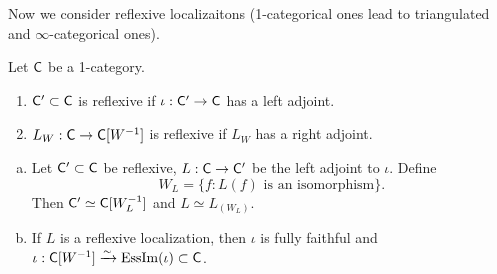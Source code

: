 Now we consider reflexive localizaitons (1-categorical ones lead to triangulated and $\infty$-categorical ones).
\begin{definition}
	Let $\mathsf{C}$ be a 1-category.
	\begin{enumerate}[1)]
		\item $\mathsf{C}'\subset \mathsf{C}$ is reflexive if $\iota:\C'\to \C$ has a left adjoint.
		\item $L_W:\C\to \C[W^{-1}]$ is reflexive if $L_W$ has a right adjoint.
	\end{enumerate}
\end{definition}

\begin{lemma}
	\begin{enumerate}[a)]
		\item Let $\mathsf{C}'\subset \mathsf{C}$ be reflexive, $L:\C\to \C'$ be the left adjoint to $\iota$. Define 
			\[
				W_L=\{f:L(f)\text{ is an isomorphism}\}.
			\]
			Then $\mathsf{C}'\simeq \mathsf{C}[W_L^{-1}]$ and $L\simeq L_{(W_L)}$.
		\item If $L$ is a reflexive localization, then $\iota$ is fully faithful and $\iota:\mathsf{C}[W^{-1}] \xrightarrow{\sim} \operatorname{EssIm}(\iota)\subset \mathsf{C}$.
	\end{enumerate}
\end{lemma}

